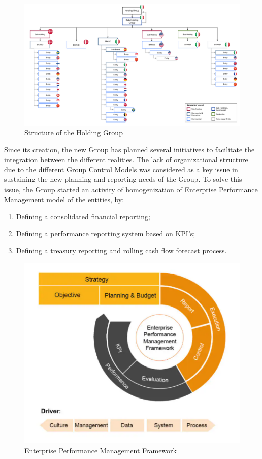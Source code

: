 \documentclass[12pt,a4paper,openright,twoside]{book}
\begin{document}
\begin{figure}[htbp]
	\centering
	\includegraphics[width=\linewidth]{figures/structure.pdf}
	\caption{Structure of the Holding Group}
	\label{fig:structure}
\end{figure}

Since its creation, the new Group has planned several initiatives to facilitate the integration between the different realities.
%
The lack of organizational structure due to the different Group Control Models was considered as a key issue in sustaining the new planning and reporting needs of the Group.
%
To solve this issue, the Group started an activity of  homogenization of Enterprise Performance Management model of the entities, by:

\begin{enumerate}
    \item Defining a consolidated financial reporting;
    \item Defining a performance reporting system based on KPI’s;
    \item Defining a treasury reporting and rolling cash flow forecast process.
\end{enumerate}

\begin{figure}[htbp]
	\centering
	\includegraphics[]{figures/cycle.pdf}
	\caption{Enterprise Performance Management Framework}
	\label{fig:cycle}
\end{figure}
\end{document}
